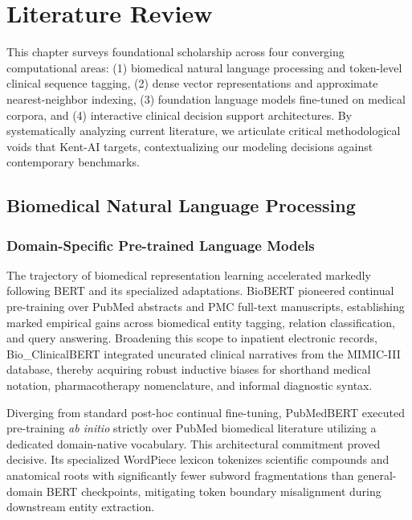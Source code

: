 
\chapter{Literature Review}
\label{Chapter2}

This chapter surveys foundational scholarship across four converging computational areas: (1) biomedical natural language processing and token-level clinical sequence tagging, (2) dense vector representations and approximate nearest-neighbor indexing, (3) foundation language models fine-tuned on medical corpora, and (4) interactive clinical decision support architectures. By systematically analyzing current literature, we articulate critical methodological voids that Kent-AI targets, contextualizing our modeling decisions against contemporary benchmarks.


\section{Biomedical Natural Language Processing}

\subsection{Domain-Specific Pre-trained Language Models}

The trajectory of biomedical representation learning accelerated markedly following BERT \cite{devlin2019bert} and its specialized adaptations. BioBERT \cite{lee2020biobert} pioneered continual pre-training over PubMed abstracts and PMC full-text manuscripts, establishing marked empirical gains across biomedical entity tagging, relation classification, and query answering. Broadening this scope to inpatient electronic records, Bio\_ClinicalBERT \cite{alsentzer2019publicly} integrated uncurated clinical narratives from the MIMIC-III database, thereby acquiring robust inductive biases for shorthand medical notation, pharmacotherapy nomenclature, and informal diagnostic syntax.

Diverging from standard post-hoc continual fine-tuning, PubMedBERT \cite{gu2021domain} executed pre-training \textit{ab initio} strictly over PubMed biomedical literature utilizing a dedicated domain-native vocabulary. This architectural commitment proved decisive. Its specialized WordPiece lexicon tokenizes scientific compounds and anatomical roots with significantly fewer subword fragmentations than general-domain BERT checkpoints, mitigating token boundary misalignment during downstream entity extraction.

